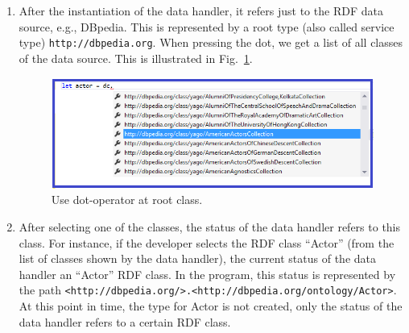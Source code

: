 \documentclass{llncs} %
\begin{document}
\begin{enumerate}
	\item After the instantiation of the data handler, it refers just
	       to the RDF data source, e.g., DBpedia. This is represented
	   by a root type (also called service type) \texttt{http://dbpedia.org}.
		  When pressing the dot, we get a list of all  classes of the data source.
			This is illustrated in Fig.~\ref{fig:showClass}.
			\begin{figure}[h]
				\centering
			\includegraphics[width=0.99\linewidth]{./figs/getClass.png}
			\caption{Use dot-operator at root class.}
			\label{fig:showClass}
			\end{figure}
	\item After selecting one of the classes, the status of the data handler refers to this class.
	    For instance, if the developer selects the RDF class ``Actor'' (from the list of classes shown by the data handler),
			the current status of the data handler  an ``Actor'' RDF class. In the program,
			this status is represented by the path \texttt{<http://dbpedia.org/>.<http://dbpedia.org/ontology/Actor>}.
			At this point in time, the type for Actor is not created, only the status of
			the data handler refers to a certain RDF class.
			

\end{enumerate}
\end{document}
